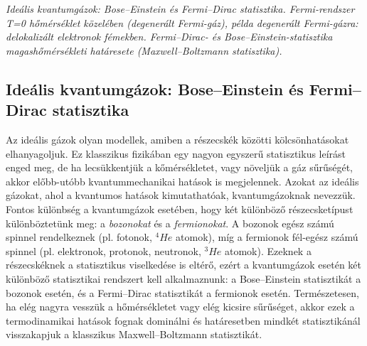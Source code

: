 \documentclass[../main.tex]{subfiles}
\begin{document}
\textit{
    Ideális kvantumgázok: Bose–Einstein és Fermi–Dirac statisztika. Fermi-rendszer T=0 hőmérséklet közelében (degenerált Fermi-gáz),
    példa degenerált Fermi-gázra: delokalizált elektronok fémekben. Fermi–Dirac- és Bose–Einstein-statisztika magashőmérsékleti határesete (Maxwell–Boltzmann statisztika).
}


\subsection{Ideális kvantumgázok: Bose–Einstein és Fermi–Dirac statisztika}
Az ideális gázok olyan modellek, amiben a részecskék közötti kölcsönhatásokat elhanyagoljuk. Ez klasszikus fizikában egy nagyon egyszerű statisztikus leírást enged meg, de ha lecsükkentjük a kőmérsékletet, vagy
növeljük a gáz sűrűségét, akkor előbb-utóbb kvantummechanikai hatások is megjelennek. Azokat az ideális gázokat, ahol a kvantumos hatások kimutathatóak, kvantumgázoknak nevezzük. Fontos különbség a kvantumgázok
esetében, hogy két különböző részecsketípust különböztetünk meg: a \textit{bozonokat} és a \textit{fermionokat}. A bozonok egész számú spinnel rendelkeznek (pl. fotonok, $^4He$ atomok), míg a fermionok fél-egész számú spinnel
(pl. elektronok, protonok, neutronok, $^3He$ atomok). Ezeknek a részecskéknek a statisztikus viselkedése is eltérő, ezért a kvantumgázok esetén két különböző statisztikai rendszert kell alkalmaznunk: a Bose–Einstein statisztikát
a bozonok esetén, és a Fermi–Dirac statisztikát a fermionok esetén. Természetesen, ha elég nagyra vesszük a hőmérsékletet vagy elég kicsire sűrűséget, akkor ezek a termodinamikai hatások fognak dominálni és határesetben
mindkét statisztikánál visszakapjuk a klasszikus Maxwell–Boltzmann statisztikát.
\end{document}
